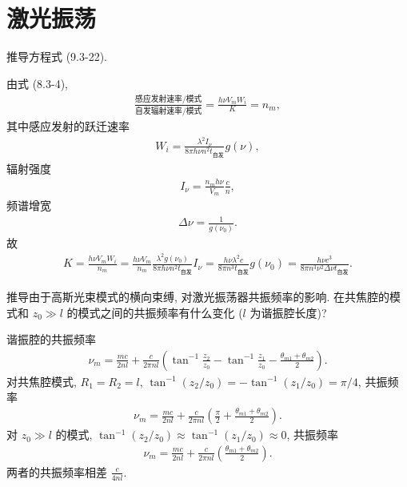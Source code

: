 \documentclass[twoside]{note}
\begin{document}
\fi
\setcounter{chapter}{8}
\chapter{激光振荡}
\begin{exe}
    推导方程式 (9.3-22).
\end{exe}
\begin{pf}
    由式 (8.3-4),
    \begin{align}
        \frac{\text{感应发射速率}/\text{模式}}{\text{自发辐射速率}/\text{模式}}=\frac{h\nu V_mW_i}{K}=n_m,
    \end{align}
    其中感应发射的跃迁速率
    \begin{align}
        W_i=\frac{\lambda^2I_{\nu}}{8\pi h\nu n^2t_{\text{自发}}}g(\nu),
    \end{align}
    辐射强度
    \begin{align}
        I_{\nu}=\frac{n_mh\nu}{V_m}\frac{c}{n},
    \end{align}
    频谱增宽
    \begin{align}
        \Delta\nu=\frac{1}{g(\nu_0)}.
    \end{align}
    故
    \begin{align}
        K=\frac{h\nu V_mW_i}{n_m}=\frac{h\nu V_m}{n_m}\frac{\lambda^2g(\nu_0)}{8\pi h\nu n^2t_{\text{自发}}}I_{\nu}=\frac{h\nu\lambda^2c}{8\pi n^3t_{\text{自发}}}g(\nu_0)=\frac{h\nu c^3}{8\pi n^3\nu^2\Delta\nu t_{\text{自发}}}.
    \end{align}
\end{pf}

\begin{exe}
    推导由于高斯光束模式的横向束缚, 对激光振荡器共振频率的影响. 在共焦腔的模式和 $z_0\gg l$ 的模式之间的共振频率有什么变化 ($l$ 为谐振腔长度)?
\end{exe}
\begin{pf}
    谐振腔的共振频率
    \begin{align}
        \nu_m=\frac{mc}{2nl}+\frac{c}{2\pi nl}\left(\tan^{-1}\frac{z_2}{z_0}-\tan^{-1}\frac{z_1}{z_0}-\frac{\theta_{m1}+\theta_{m2}}{2}\right).
    \end{align}
    对共焦腔模式, $R_1=R_2=l$, $\tan^{-1}(z_2/z_0)=-\tan^{-1}(z_1/z_0)=\pi/4$, 共振频率
    \begin{align}
        \nu_m=\frac{mc}{2nl}+\frac{c}{2\pi nl}\left(\frac{\pi}{2}+\frac{\theta_{m1}+\theta_{m2}}{2}\right).
    \end{align}
    对 $z_0\gg l$ 的模式, $\tan^{-1}(z_2/z_0)\approx\tan^{-1}(z_1/z_0)\approx 0$, 共振频率
    \begin{align}
        \nu_m=\frac{mc}{2nl}+\frac{c}{2\pi nl}\left(\frac{\theta_{m1}+\theta_{m2}}{2}\right).
    \end{align}
    两者的共振频率相差 $\frac{c}{4nl}$.
\end{pf}
\end{document}
